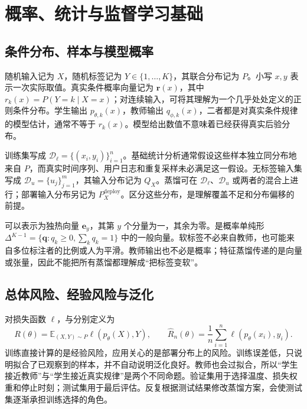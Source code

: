 \documentclass[UTF8,12pt,a4paper,fontset=fandol]{ctexart}
\begin{document}
\section{概率、统计与监督学习基础}
\label{sec:kd-probability}

\subsection{条件分布、样本与模型概率}
随机输入记为 $X$，随机标签记为 $Y\in\{1,\ldots,K\}$，其联合分布记为 $P$。小写 $x,y$ 表示一次实际取值。真实条件概率向量记为 $\mathbf r(x)$，其中 $r_k(x)=P(Y=k\mid X=x)$；对连续输入，可将其理解为一个几乎处处定义的正则条件分布。学生输出 $p_{\theta,k}(x)$，教师输出 $q_{\phi,k}(x)$，二者都是对真实条件规律的模型估计，通常不等于 $r_k(x)$。模型给出数值不意味着已经获得真实后验分布。

训练集写成 $\mathcal D_\ell=\{(x_i,y_i)\}_{i=1}^n$。基础统计分析通常假设这些样本独立同分布地来自 $P$，而真实时间序列、用户日志和重复采样未必满足这一假设。无标签输入集写成 $\mathcal D_u=\{u_j\}_{j=1}^m$，其输入分布记为 $Q_X$。蒸馏可在 $\mathcal D_\ell$、$\mathcal D_u$ 或两者的混合上进行；部署输入分布另记为 $P_X^{\mathrm{deploy}}$。区分这些分布，是理解覆盖不足和分布偏移的前提。

可以表示为独热向量 $\mathbf e_y$，其第 $y$ 个分量为一，其余为零。是概率单纯形 $\Delta^{K-1}=\{\mathbf q:q_k\geq0,\sum_kq_k=1\}$ 中的一般向量。软标签不必来自教师，也可能来自多位标注者的比例或人为平滑。教师输出也不必是概率；特征蒸馏传递的是向量或张量，因此不能把所有蒸馏都理解成“把标签变软”。

\subsection{总体风险、经验风险与泛化}
对损失函数 $\ell$，与分别定义为
\begin{equation}
 R(\theta)=\mathbb E_{(X,Y)\sim P}\ell(p_\theta(X),Y),\qquad
 \widehat R_n(\theta)=\frac1n\sum_{i=1}^n\ell(p_\theta(x_i),y_i).
 \label{eq:kd-risk}
\end{equation}
训练直接计算的是经验风险，应用关心的是部署分布上的风险。训练误差低，只说明拟合了已观察到的样本，并不自动说明泛化良好。教师也会过拟合，所以“学生接近教师”与“学生接近真实规律”是两个不同命题。验证集用于选择温度、损失权重和停止时刻；测试集用于最后评估。反复根据测试结果修改蒸馏方案，会使测试集逐渐承担训练选择的角色。
\end{document}
